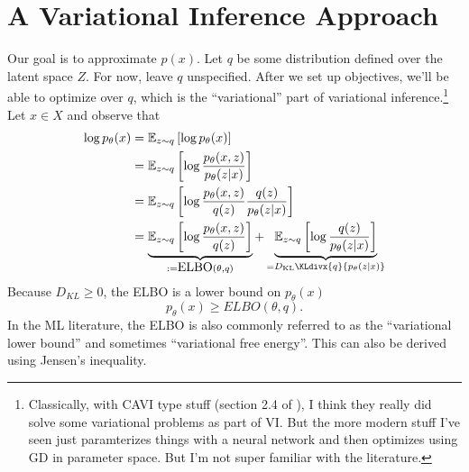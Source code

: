 \documentclass{article}
\newcommand{\E}{\mathbb{E}}
\newcommand{\KLdiv}{D_{\text{KL}}\KLdivx}
\begin{document}
\section{A Variational Inference Approach}

Our goal is to approximate $p(x)$. Let $q$ be some distribution defined over the latent space $Z$. For now, leave $q$ unspecified. After we set up objectives, we'll be able to optimize over $q$, which is the ``variational'' part of variational inference.\footnote{Classically, with CAVI type stuff (section 2.4 of \cite{blei2017variational}), I think they really did solve some variational problems as part of VI. But the more modern stuff I've seen just paramterizes things with a neural network and then optimizes using GD in parameter space. But I'm not super familiar with the literature.} Let $x\in X$ and observe that
\begin{align}
    \log p_\theta(x) & = \E_{z\sim q}\left[ \log p_\theta(x) \right]\\
    & = \E_{z\sim q}\left[\log \frac{p_\theta(x,z)}{p_\theta(z|x)} \right]\\
    & = \E_{z\sim q}\left[ \log \frac{p_\theta(x,z)}{q(z)} \frac{q(z)}{p_\theta(z|x)} \right]\\
    & = \underbrace{\E_{z\sim q}\left[ \log\frac{p_\theta(x,z)}{q(z)}\right]}_{:= \mbox{ELBO}(\theta, q)} + \underbrace{\E_{z\sim q}\left[\log \frac{q(z)}{p_\theta(z|x)} \right]}_{=\KLdiv{q}{p_\theta(z|x)}} \label{eq:ELBO-pls-KL}
\end{align}
Because $D_{KL} \geq 0$, the ELBO is a lower bound on $p_\theta(x)$
$$
p_\theta(x) \geq ELBO(\theta, q).
$$
In the ML literature, the ELBO is also commonly referred to as the ``variational lower bound'' and sometimes ``variational free energy''. This can also be derived using Jensen's inequality. 
\end{document}
